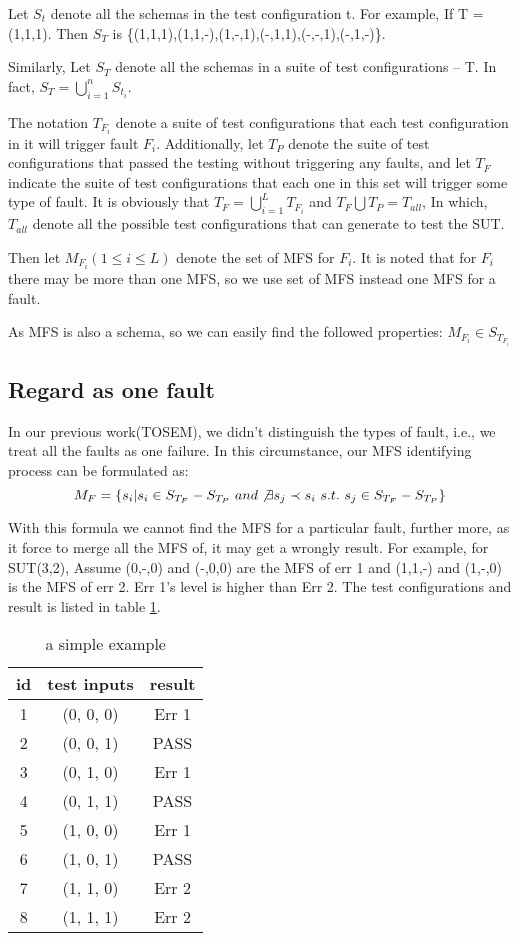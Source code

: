 \documentclass{sig-alternate}
\begin{document}
Let $S_{t}$ denote all the schemas in the test configuration t.  For example, If T = (1,1,1). Then $S_{T}$ is \{(1,1,1),(1,1,-),(1,-,1),(-,1,1),(-,-,1),(-,1,-)\}.

Similarly, Let $S_{T}$ denote all the schemas in a suite of test configurations -- T. In fact, $S_{T} = \bigcup_{i = 1}^{n}S_{t_{i}}$.

The notation $T_{F_{i}}$ denote a suite of test configurations that each test configuration in it will trigger fault $F_{i}$. Additionally, let $T_{P}$ denote the suite of test configurations that passed the testing without triggering any faults, and let $T_{F}$ indicate the suite of test configurations that each one in this set will trigger some type of fault. It is obviously that $T_{F} =  \bigcup_{i = 1}^{L}T_{F_{i}}$ and $T_{F}\bigcup T_{P} = T_{all}$, In which, $T_{all}$ denote all the possible test configurations that can generate to test the SUT.


Then let $ M_{F_{i}} ( 1 \leq i \leq L) $ denote the set of MFS for $F_{i}$. It is noted that for $F_{i}$ there may be more than one MFS, so we use set of MFS instead one MFS for a fault.

As MFS is also a schema, so we can easily find the followed properties:
$ M_{F_{i}} \in S_{T_{F_{i}}} $



\subsection{Regard as one fault}

In our previous work(TOSEM), we didn't distinguish the types of fault, i.e., we treat all the faults as one failure. In this circumstance, our MFS identifying process can be formulated as:
$$ M_{F} = \{s_{i} | s_{i} \in S_{T_{F}} - S_{T_{P}}\ and \not\exists s_{j} \prec s_{i}\ s.t.\ s_{j} \in S_{T_{F}} - S_{T_{P}} \}$$

With this formula we cannot find the MFS for a particular fault, further more, as it force to merge all the MFS of, it may get a wrongly result. For example,
for SUT(3,2), Assume (0,-,0) and (-,0,0) are the MFS of err 1 and (1,1,-) and (1,-,0) is the MFS of err 2. Err 1's level is higher than Err 2. The test configurations and result is listed in table \ref{example_first_scenario}.

\begin{table}
\centering
\caption{a simple example}
\label{example_first_scenario}
\begin{tabular}{|c|c|c|} \hline
id&test inputs & result\\\hline
1&(0, 0, 0) &  Err 1\\ \hline
2&(0, 0, 1) &  PASS\\ \hline
3&(0, 1, 0) &  Err 1\\ \hline
4&(0, 1, 1) &  PASS\\ \hline
5&(1, 0, 0) &  Err 1\\ \hline
6&(1, 0, 1) &  PASS\\ \hline
7&(1, 1, 0) &  Err 2\\ \hline
8&(1, 1, 1) &  Err 2\\ \hline
\hline\end{tabular}
\end{table}
\end{document}
